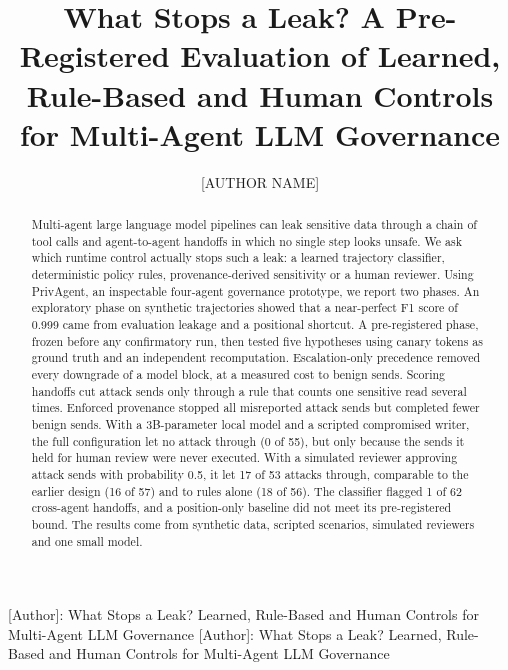 \documentclass{ieeeaccess}
\begin{document}

\title{What Stops a Leak? A Pre-Registered Evaluation of Learned, Rule-Based and Human Controls for Multi-Agent LLM Governance}
\author{\uppercase{[Author Name]}}
\address[1]{[needs-author: department, institution, city, postcode, country] (e-mail: [needs-author])}

\markboth
{[Author]: What Stops a Leak? Learned, Rule-Based and Human Controls for Multi-Agent LLM Governance}
{[Author]: What Stops a Leak? Learned, Rule-Based and Human Controls for Multi-Agent LLM Governance}


\begin{abstract}
Multi-agent large language model pipelines can leak sensitive data through a chain of tool calls and agent-to-agent handoffs in which no single step looks unsafe. We ask which runtime control actually stops such a leak: a learned trajectory classifier, deterministic policy rules, provenance-derived sensitivity or a human reviewer. Using PrivAgent, an inspectable four-agent governance prototype, we report two phases. An exploratory phase on synthetic trajectories showed that a near-perfect F1 score of 0.999 came from evaluation leakage and a positional shortcut. %
A pre-registered phase, frozen before any confirmatory run, then tested five hypotheses using canary tokens as ground truth and an independent recomputation. %
Escalation-only precedence removed every downgrade of a model block, at a measured cost to benign sends. %
Scoring handoffs cut attack sends only through a rule that counts one sensitive read several times. %
Enforced provenance stopped all misreported attack sends but completed fewer benign sends. %
With a 3B-parameter local model and a scripted compromised writer, the full configuration let no attack through (0 of 55), but only because the sends it held for human review were never executed. With a simulated reviewer approving attack sends with probability 0.5, it let 17 of 53 attacks through, comparable to the earlier design (16 of 57) and to rules alone (18 of 56). %
The classifier flagged 1 of 62 cross-agent handoffs, and a position-only baseline did not meet its pre-registered bound. %
The results come from synthetic data, scripted scenarios, simulated reviewers and one small model.
\end{abstract}
\end{document}

